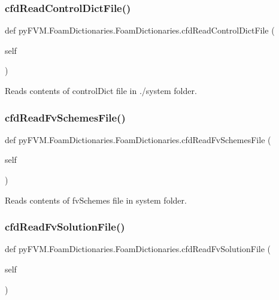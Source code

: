 \subsubsection{\texorpdfstring{cfdReadControlDictFile()}{cfdReadControlDictFile()}}
{\footnotesize\ttfamily def py\+F\+V\+M.\+Foam\+Dictionaries.\+Foam\+Dictionaries.\+cfd\+Read\+Control\+Dict\+File (\begin{DoxyParamCaption}\item[{}]{self }\end{DoxyParamCaption})}

\begin{DoxyVerb}Reads contents of controlDict file in ./system folder.
\end{DoxyVerb}
 \mbox{\label{classpy_f_v_m_1_1_foam_dictionaries_1_1_foam_dictionaries_a586259cd3d8177fffb2657fcb0fbbdda}} 
\subsubsection{\texorpdfstring{cfdReadFvSchemesFile()}{cfdReadFvSchemesFile()}}
{\footnotesize\ttfamily def py\+F\+V\+M.\+Foam\+Dictionaries.\+Foam\+Dictionaries.\+cfd\+Read\+Fv\+Schemes\+File (\begin{DoxyParamCaption}\item[{}]{self }\end{DoxyParamCaption})}

\begin{DoxyVerb}Reads contents of fvSchemes file in system folder.
\end{DoxyVerb}
 \mbox{\label{classpy_f_v_m_1_1_foam_dictionaries_1_1_foam_dictionaries_a5b9c95cb974f3a14b4c882c127aa03b0}} 
\subsubsection{\texorpdfstring{cfdReadFvSolutionFile()}{cfdReadFvSolutionFile()}}
{\footnotesize\ttfamily def py\+F\+V\+M.\+Foam\+Dictionaries.\+Foam\+Dictionaries.\+cfd\+Read\+Fv\+Solution\+File (\begin{DoxyParamCaption}\item[{}]{self }\end{DoxyParamCaption})}

